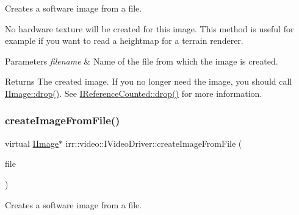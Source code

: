 Creates a software image from a file. 

No hardware texture will be created for this image. This method is useful for example if you want to read a heightmap for a terrain renderer. 
\begin{DoxyParams}{Parameters}
{\em filename} & Name of the file from which the image is created. \\
\hline
\end{DoxyParams}
\begin{DoxyReturn}{Returns}
The created image. If you no longer need the image, you should call \hyperlink{classirr_1_1IReferenceCounted_a03856a09355b89d178090c4a5f738543}{I\+Image\+::drop()}. See \hyperlink{classirr_1_1IReferenceCounted_a03856a09355b89d178090c4a5f738543}{I\+Reference\+Counted\+::drop()} for more information. 
\end{DoxyReturn}
\mbox{\label{classirr_1_1video_1_1IVideoDriver_a322c41fa08c1da9de4633cf8a1e68607}} 
\subsubsection{\texorpdfstring{create\+Image\+From\+File()}{createImageFromFile()}\hspace{0.1cm}{\footnotesize\ttfamily [3/4]}}
{\footnotesize\ttfamily virtual \hyperlink{classirr_1_1video_1_1IImage}{I\+Image}$\ast$ irr\+::video\+::\+I\+Video\+Driver\+::create\+Image\+From\+File (\begin{DoxyParamCaption}\item[{\hyperlink{classirr_1_1io_1_1IReadFile}{io\+::\+I\+Read\+File} $\ast$}]{file }\end{DoxyParamCaption})\hspace{0.3cm}{\ttfamily [pure virtual]}}



Creates a software image from a file. 

